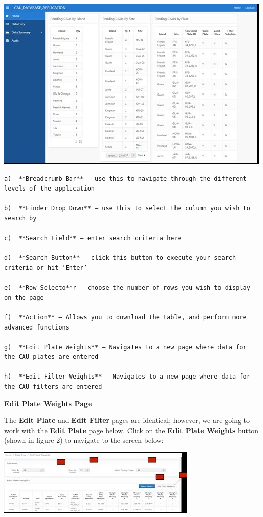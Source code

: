\documentclass[]{book}
\begin{document}
\includegraphics{images/Data2.jpg}

\begin{verbatim}
a)  **Breadcrumb Bar** – use this to navigate through the different levels of the application  

b)  **Finder Drop Down** – use this to select the column you wish to search by  

c)  **Search Field** – enter search criteria here  

d)  **Search Button** – click this button to execute your search criteria or hit ‘Enter’  

e)  **Row Selecto**r – choose the number of rows you wish to display on the page  

f)  **Action** – Allows you to download the table, and perform more advanced functions  

g)  **Edit Plate Weights** – Navigates to a new page where data for the CAU plates are entered  

h)  **Edit Filter Weights** – Navigates to a new page where data for the CAU filters are entered  
\end{verbatim}

\textbf{Edit Plate Weights Page}

The \textbf{Edit Plate} and \textbf{Edit Filter} pages are identical; however, we are going to work with the \textbf{Edit Plate} page below. Click on the \textbf{Edit Plate Weights} button (shown in figure 2) to navigate to the screen below:

\includegraphics{images/Data3.jpg}
\end{document}
